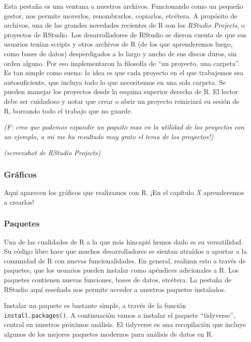\documentclass[]{book}
\begin{document}
Esta pestaña es una ventana a nuestros archivos. Funcionando como un
pequeño gestor, nos permite moverlos, renombrarlos, copiarlos, etcétera.
A propósito de archivos, una de las grandes novedades recientes de R son
los \emph{RStudio Projects}, o proyectos de RStudio. Los desarrolladores
de RStudio se dieron cuenta de que sus usuarios tenían scripts y otros
archivos de R (de los que aprenderemos luego, como bases de datos)
desperdigados a lo largo y ancho de sus discos duros, sin orden alguno.
Por eso implementaron la filosofía de ``un proyecto, una carpeta''. Es
tan simple como suena: la idea es que cada proyecto en el que trabajemos
sea autosuficiente, que incluya todo lo que necesitemos en una sola
carpeta. Se pueden manejar los proyectos desde la esquina superior
derecha de R. El lector debe ser cuidadoso y notar que crear o abrir un
proyecto reiniciará su sesión de R, borrando todo el trabajo que no
guarde.

\emph{(F: creo que podemos expandir un poquito mas en la utilidad de los
proyectos con un ejemplo, a mi me ha resultado muy grato el tema de los
proyectos!)}

\emph{(screenshot de RStudio Projects)}

\hypertarget{graficos}{%
\subsubsection{Gráficos}\label{graficos}}

Aquí aparecen los gráficos que realizamos con R. ¡En el capítulo
\emph{X} aprenderemos a crearlos!

\hypertarget{paquetes}{%
\subsubsection{Paquetes}\label{paquetes}}

Una de las cualidades de R a la que más hincapié hemos dado es su
versatilidad. Su código libre hace que muchos desarrolladores se sientan
atraídos a aportar a la comunidad de R con nuevas funcionalidades. En
general, realizan esto a través de paquetes, que los usuarios pueden
instalar como apéndices adicionales a R. Los paquetes contienen nuevas
funciones, bases de datos, etcétera. La pestaña de RStudio aquí reseñada
nos permite acceder a nuestros paquetes instalados.

Instalar un paquete es bastante simple, a través de la función
\texttt{install.packages()}. A continuación vamos a instalar el paquete
``tidyverse'', central en nuestros próximos análisis. El tidyverse es
una recopilación que incluye algunos de los mejores paquetes modernos
para análisis de datos en R.
\end{document}
